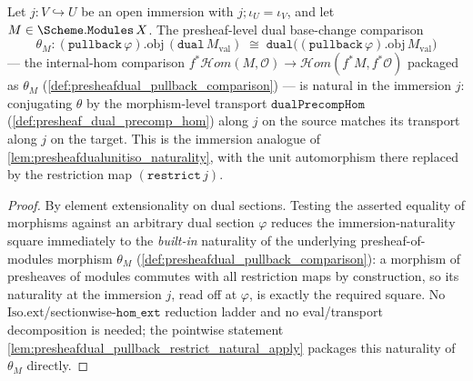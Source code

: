 \begin{lemma}

  \label{lem:presheafdual_pullback_restrict_natural}
  Let \(j : V \hookrightarrow U\) be an open immersion with \(j \mathbin{;} \iota_U = \iota_V\), and let
  \(M \in \Scheme.\mathtt{Modules}\,X\). The presheaf-level dual base-change comparison
  \[
    \theta_M : (\mathtt{pullback}\,\varphi).\mathrm{obj}\,(\mathtt{dual}\,M_{\mathrm{val}})
      \;\cong\; \mathtt{dual}\bigl((\mathtt{pullback}\,\varphi).\mathrm{obj}\,M_{\mathrm{val}}\bigr)
  \]
  --- the internal-hom comparison
  \(f^{*}\mathcal{H}om(M, \mathcal{O}) \to \mathcal{H}om(f^{*}M, f^{*}\mathcal{O})\) packaged as
  \(\theta_M\) (\cref{def:presheafdual_pullback_comparison}) --- is natural in the immersion
  \(j\): conjugating \(\theta\) by the morphism-level transport \(\mathtt{dualPrecompHom}\)
  (\cref{def:presheaf_dual_precomp_hom}) along \(j\) on the source matches its transport along
  \(j\) on the target. This is the immersion analogue of \cref{lem:presheafdualunitiso_naturality},
  with the unit automorphism there replaced by the restriction map \((\mathtt{restrict}\,j)\).
\end{lemma}
\begin{proof}
  \leanok
  By element extensionality on dual sections. Testing the asserted equality of morphisms against an
  arbitrary dual section \(\varphi\) reduces the immersion-naturality square immediately to the
  \emph{built-in} naturality of the underlying presheaf-of-modules morphism \(\theta_M\)
  (\cref{def:presheafdual_pullback_comparison}): a morphism of presheaves of modules commutes with all
  restriction maps by construction, so its naturality at the immersion \(j\), read off at \(\varphi\),
  is exactly the required square. No \(\mathrm{Iso.ext}\)/sectionwise-\(\mathtt{hom\_ext}\) reduction
  ladder and no eval/transport decomposition is needed; the pointwise statement
  \cref{lem:presheafdual_pullback_restrict_natural_apply} packages this naturality of \(\theta_M\)
  directly.
\end{proof}

